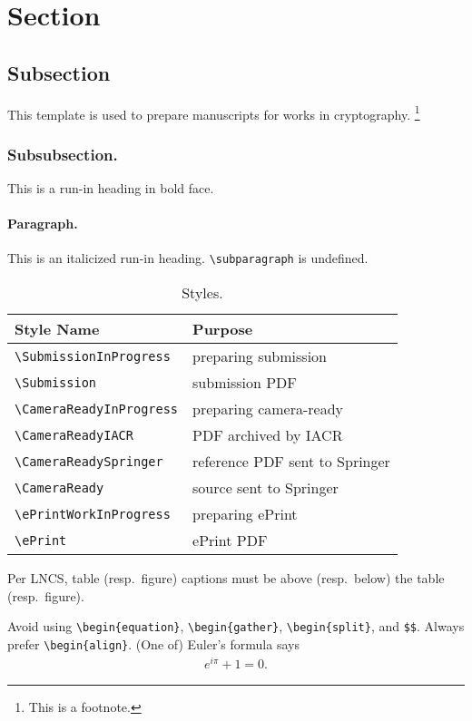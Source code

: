 \section{Section}
\subsection{Subsection}

This template is used to prepare manuscripts for works in cryptography.%
\footnote{This is a footnote.}

\subsubsection{Subsubsection.}
This is a run-in heading in bold face.

\paragraph{Paragraph.}
This is an italicized run-in heading.
\texttt{\textbackslash subparagraph} is undefined.

\begin{table}[h]
\centering
\caption{Styles.}
\label{tab:table1}
\begin{tabular}{ll}
\toprule
Style Name & Purpose \\
\midrule
\texttt{\textbackslash SubmissionInProgress} &
preparing submission \\
\texttt{\textbackslash Submission} &
submission PDF \\
\texttt{\textbackslash CameraReadyInProgress} &
preparing camera-ready \\
\texttt{\textbackslash CameraReadyIACR} &
PDF archived by IACR \\
\texttt{\textbackslash CameraReadySpringer} &
reference PDF sent to Springer \\
\texttt{\textbackslash CameraReady} &
source sent to Springer \\
\texttt{\textbackslash ePrintWorkInProgress} &
preparing ePrint \\
\texttt{\textbackslash ePrint} &
ePrint PDF \\
\bottomrule
\end{tabular}
\end{table}

Per LNCS,
table (resp.~figure) captions must be above (resp.~below) the table (resp.~figure).

Avoid using \texttt{\textbackslash begin\{equation\}},
\texttt{\textbackslash begin\{gather\}},
\texttt{\textbackslash begin\{split\}},
and \texttt{\$\$}.
Always prefer \texttt{\textbackslash begin\{align\}}.
(One of) Euler's formula says
\begin{align*}
e^{i\pi}+1=0.
\end{align*}

